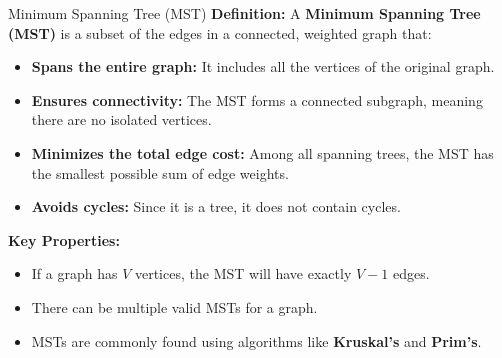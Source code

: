 \begin{frame}{Minimum Spanning Tree (MST)}
\textbf{Definition:}  
A \textbf{Minimum Spanning Tree (MST)} is a subset of the edges in a connected, weighted graph that:
\begin{itemize}
    \item \textbf{Spans the entire graph:} It includes all the vertices of the original graph.
    \item \textbf{Ensures connectivity:} The MST forms a connected subgraph, meaning there are no isolated vertices.
    \item \textbf{Minimizes the total edge cost:} Among all spanning trees, the MST has the smallest possible sum of edge weights.
    \item \textbf{Avoids cycles:} Since it is a tree, it does not contain cycles.
\end{itemize}

\textbf{Key Properties:}
\begin{itemize}
    \item If a graph has \( V \) vertices, the MST will have exactly \( V-1 \) edges.
    \item There can be multiple valid MSTs for a graph.
    \item MSTs are commonly found using algorithms like \textbf{Kruskal's} and \textbf{Prim's}.
\end{itemize}
\end{frame}






